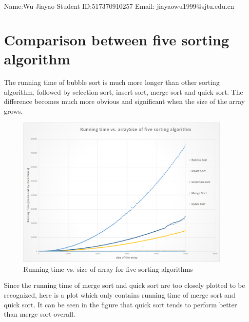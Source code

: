 \documentclass[12pt,a4paper]{article}
\theoremstyle{definition}
\begin{document}
\noindent

\noindent{}
\begin{center}    
    \footnotesize{\color{blue}Name:Wu Jiayao  \quad Student ID:517370910257 \quad Email: jiayaowu1999@sjtu.edu.cn}
    \end{center}
    
\section{Comparison between five sorting
algorithm}
\par The running time of bubble sort is much more longer than other sorting
algorithm, followed by selection sort, insert sort, merge sort and quick
sort. The difference becomes much more obvious and significant when the
size of the array grows.
\begin{figure}[htbp]
    \centering
    \includegraphics[width=0.95\textwidth]{1.png}
    \caption{Running time vs. size of array for five sorting algorithms}
\end{figure}
\newpage
\par Since the running time of merge sort and quick sort are too closely
plotted to be recognized, here is a plot which only contains running
time of merge sort and quick sort. It can be seen in the figure that quick sort tends to perform better
than merge sort overall.
\end{document}
